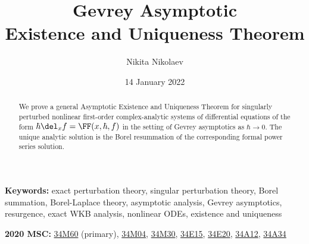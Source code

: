 \documentclass[11pt]{article}
\newcommand{\MSCSubjectCode}[1]{\href{https://zbmath.org/classification/?q=cc\%3A#1}{#1}}
\begin{document}

\title{Gevrey Asymptotic \\ Existence and Uniqueness Theorem}

\author{Nikita Nikolaev}


\date{14 January 2022}

\maketitle
\thispagestyle{frontpage}

\begin{abstract}
\noindent
We prove a general Asymptotic Existence and Uniqueness Theorem for singularly perturbed nonlinear first-order complex-analytic systems of differential equations of the form $\hbar \del_x f = \FF (x, \hbar, f)$ in the setting of Gevrey asymptotics as $\hbar \to 0$.
The unique analytic solution is the Borel resummation of the corresponding formal power series solution.
\end{abstract}

{\small
\textbf{Keywords:}
exact perturbation theory, singular perturbation theory, Borel summation, Borel-Laplace theory, asymptotic analysis, Gevrey asymptotics, resurgence, exact WKB analysis, nonlinear ODEs, existence and uniqueness

\textbf{2020 MSC:} 
	\MSCSubjectCode{34M60} (primary),
	\MSCSubjectCode{34M04},
	\MSCSubjectCode{34M30},
	\MSCSubjectCode{34E15},
	\MSCSubjectCode{34E20},
	\MSCSubjectCode{34A12},
	\MSCSubjectCode{34A34}
}


{\begin{spacing}{0.9}
\small
\setcounter{tocdepth}{3}
\tableofcontents
\end{spacing}
}

\newpage
\end{document}
